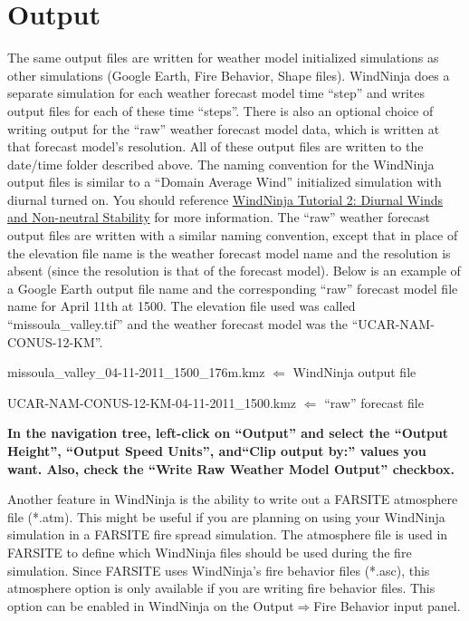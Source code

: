 \documentclass[12pt]{article}
\begin{document}
\section{Output}
The same output files are written for weather model initialized simulations as other simulations (Google Earth, Fire Behavior, Shape files).  WindNinja does a separate simulation for each weather forecast model time “step” and writes output files for each of these time “steps”.  There is also an optional choice of writing output for the “raw” weather forecast model data, which is written at that forecast model's resolution.  All of these output files are written to the date/time folder described above.  The naming convention for the WindNinja output files is similar to a “Domain Average Wind” initialized simulation with diurnal turned on.  You should reference \href{https://weather.firelab.org/windninja/tutorials/WindNinja_tutorial2.pdf}{WindNinja Tutorial 2: Diurnal Winds and Non-neutral Stability} for more information.  The “raw” weather forecast output files are written with a similar naming convention, except that in place of the elevation file name is the weather forecast model name and the resolution is absent (since the resolution is that of the forecast model).  Below is an example of a Google Earth output file name and the corresponding “raw” forecast model file name for April 11th at 1500.  The elevation file used was called “missoula\_valley.tif” and the weather forecast model was the “UCAR-NAM-CONUS-12-KM”.

missoula\_valley\_04-11-2011\_1500\_176m.kmz $\Leftarrow$ WindNinja output file

UCAR-NAM-CONUS-12-KM-04-11-2011\_1500.kmz  $\Leftarrow$  “raw” forecast file

\textbf{\color{red} In the navigation tree, left-click on “Output” and select the “Output Height”, “Output Speed Units”, and“Clip output by:” values you want.  Also, check the “Write Raw Weather Model Output” checkbox.}

Another feature in WindNinja is the ability to write out a FARSITE atmosphere file (*.atm).  This might be useful if you are planning on using your WindNinja simulation in a FARSITE fire spread simulation.  The atmosphere file is used in FARSITE to define which WindNinja files should be used during the fire simulation.  Since FARSITE uses WindNinja's fire behavior files (*.asc), this atmosphere option is only available if you are writing fire behavior files.  This option can be enabled in WindNinja on the Output$\Rightarrow$Fire Behavior input panel.
\end{document}
